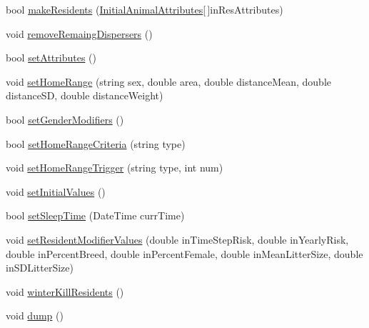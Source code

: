 \begin{DoxyCompactItemize}
bool \hyperlink{class_p_a_z___dispersal_1_1_animal_manager_a5c0fa0e03aca5d84c403931e13703e7e}{make\-Residents} (\hyperlink{class_p_a_z___dispersal_1_1_initial_animal_attributes}{Initial\-Animal\-Attributes}\mbox{[}$\,$\mbox{]}in\-Res\-Attributes)
\item 
void \hyperlink{class_p_a_z___dispersal_1_1_animal_manager_a4acc3f4831026efdb8a921c25474888d}{remove\-Remaing\-Dispersers} ()
\item 
bool \hyperlink{class_p_a_z___dispersal_1_1_animal_manager_ae12abc5c1a47051d4578368627e13e21}{set\-Attributes} ()
\item 
void \hyperlink{class_p_a_z___dispersal_1_1_animal_manager_ae5760150c55796b266b4ef6956ebc7c3}{set\-Home\-Range} (string sex, double area, double distance\-Mean, double distance\-S\-D, double distance\-Weight)
\item 
bool \hyperlink{class_p_a_z___dispersal_1_1_animal_manager_ac59ef7c35ab4e75757bcdf5617e80a8e}{set\-Gender\-Modifiers} ()
\item 
bool \hyperlink{class_p_a_z___dispersal_1_1_animal_manager_a625aa8c8d0f12817b4e131c3f068c1f2}{set\-Home\-Range\-Criteria} (string type)
\item 
void \hyperlink{class_p_a_z___dispersal_1_1_animal_manager_a80903d63dff0432d01b79b28fd7a86f7}{set\-Home\-Range\-Trigger} (string type, int num)
\item 
void \hyperlink{class_p_a_z___dispersal_1_1_animal_manager_aa872fafb12ee53e87b009de280360d1f}{set\-Initial\-Values} ()
\item 
bool \hyperlink{class_p_a_z___dispersal_1_1_animal_manager_a7447520ae509a9b97dbec370fbc133e3}{set\-Sleep\-Time} (Date\-Time curr\-Time)
\item 
void \hyperlink{class_p_a_z___dispersal_1_1_animal_manager_ae55249f9ae8f6497de44be2718ac3f93}{set\-Resident\-Modifier\-Values} (double in\-Time\-Step\-Risk, double in\-Yearly\-Risk, double in\-Percent\-Breed, double in\-Percent\-Female, double in\-Mean\-Litter\-Size, double in\-S\-D\-Litter\-Size)
\item 
void \hyperlink{class_p_a_z___dispersal_1_1_animal_manager_ab593ce06eec1393a3cb630af3db4d0c2}{winter\-Kill\-Residents} ()
\item 
void \hyperlink{class_p_a_z___dispersal_1_1_animal_manager_ab6f396e2365077696bed6b2305f80d0a}{dump} ()
\end{DoxyCompactItemize}
